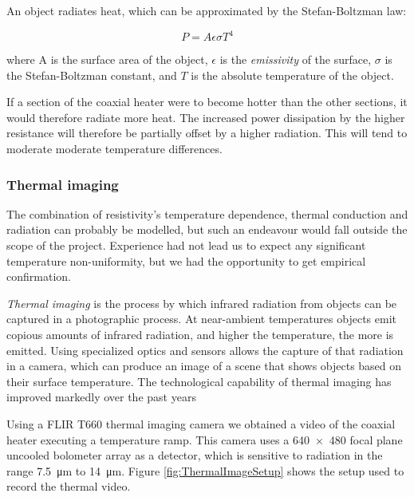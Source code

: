 An object radiates heat, which can be approximated by the Stefan-Boltzman law:

\[P=A \epsilon \sigma T^4\]

where A is the surface area of the object, \(\epsilon\) is the
\textit{emissivity} of the surface, \(\sigma\) is the Stefan-Boltzman constant,
and \(T\) is the absolute temperature of the object. 

If a section of the coaxial heater were to become hotter than the other
sections, it would therefore radiate more heat. The increased power dissipation
by the higher resistance will therefore be partially offset by a higher
radiation. This will tend to moderate moderate temperature differences.

\subsubsection{Thermal imaging}

The combination of resistivity's temperature dependence, thermal conduction and
radiation can probably be modelled, but such an endeavour would fall outside the
scope of the project. Experience had not lead us to expect any significant
temperature non-uniformity, but we had the opportunity to get empirical
confirmation.

\textit{Thermal imaging} is the process by which infrared radiation from objects
can be captured in a photographic process. At near-ambient temperatures objects
emit copious amounts of infrared radiation, and higher the temperature, the more
is emitted. Using specialized optics and sensors allows the capture of that
radiation in a camera, which can produce an image of a scene that shows objects
based on their surface temperature. The technological capability of thermal
imaging has improved markedly over the past years

Using a FLIR{\texttrademark} T660 thermal imaging camera we obtained a video of
the coaxial heater executing a temperature ramp. This camera uses a \num{640 x 480}
focal plane uncooled bolometer array as a detector, which is sensitive to
radiation in the range \SI{7.5}{\micro\metre} to \SI{14}{\micro\metre}.
Figure \ref{fig:ThermalImageSetup} shows the setup used to record the thermal
video.

